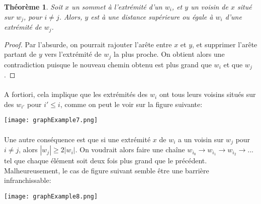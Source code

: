 \documentclass[a4paper]{article}
\newtheorem{theorem}{Théorème}
\theoremstyle{definition}
\theoremstyle{remark}
\begin{document}
\begin{theorem}
Soit $x$ un sommet à l'extrémité d'un $w_{i}$, et $y$ un voisin de $x$
situé sur $w_{j}$, pour $i \neq j$. Alors, $y$ est à une distance supérieure ou égale à $w_{i}$ d'une extrémité de $w_{j}$.
\end{theorem}

\begin{proof}
Par l'absurde, on pourrait rajouter l'arête entre $x$ et $y$, et
supprimer l'arête partant de $y$ vers l'extrémité de $w_{j}$ la plus
proche. On obtient alors une contradiction puisque le nouveau chemin obtenu est plus grand que $w_{i}$ et que $w_{j}$.
\end{proof}


\paragraph{}
A fortiori, cela implique que les extrémités des $w_{i}$ ont tous leurs
voisins situés sur des $w_{i'}$ pour $i' \leq i$, comme on peut le voir 
sur la figure suivante:

\texttt{[image: graphExample7.png]}

\paragraph{}
Une autre conséquence est que si une extrémité $x$ de $w_{i}$ a un voisin sur $w_{j}$ pour $i \neq j$, alors $|w_{j}| \geq 2|w_{i}|$. On 
voudrait alors faire une chaîne $w_{i_{0}} \rightarrow w_{i_{1}} \rightarrow w_{i_{2}} \rightarrow ...$ tel que chaque élément soit deux 
fois plus grand que le précédent. Malheureusement, le cas de figure 
suivant semble être une barrière infranchissable:

\texttt{[image: graphExample8.png]}
\end{document}
